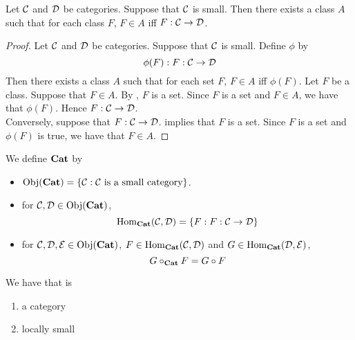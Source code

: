 \documentclass{book}
\begin{document}
	\begin{ex} 
		Let $\mathcal{C}$ and $\mathcal{D}$ be categories. Suppose that $\mathcal{C}$ is small. Then there exists a class $A$ such that for each class $F$, $F \in A$ iff $F: \mathcal{C} \rightarrow \mathcal{D}$.   
	\end{ex}
	
	\begin{proof} 
		Let $\mathcal{C}$ and $\mathcal{D}$ be categories. Suppose that $\mathcal{C}$ is small. Define $\phi$ by 
		$$\phi(F) : F : \mathcal{C} \rightarrow \mathcal{D}$$ 
		Then there exists a class $A$ such that for each set $F$, $F \in A$ iff $\phi(F)$. Let $F$ be a class. Suppose that $F \in A$. By , $F$ is a set. Since $F$ is a set and $F \in A$, we have that $\phi(F)$. Hence $F: \mathcal{C} \rightarrow \mathcal{D}$. \\
		Conversely, suppose that $F: \mathcal{C} \rightarrow \mathcal{D}$.  implies that $F$ is a set. Since $F$ is a set and $\phi(F)$ is true, we have that $F \in A$. 
	\end{proof}
	
	\begin{defn} 
		We define $\textbf{Cat}$ by 
		\begin{itemize}
			\item $\operatorname{Obj}(\textbf{Cat}) = \{\mathcal{C}: \mathcal{C} \text{ is a small category}\}$.
			\item for $\mathcal{C},\mathcal{D} \in \operatorname{Obj}(\textbf{Cat})$, 
			$$\operatorname{Hom}_{\textbf{Cat}}(\mathcal{C},\mathcal{D}) = \{F : F: \mathcal{C} \rightarrow \mathcal{D} \}$$
			\item for $\mathcal{C},\mathcal{D}, \mathcal{E} \in \operatorname{Obj}(\textbf{Cat})$, $F \in \operatorname{Hom}_{\textbf{Cat}}(\mathcal{C},\mathcal{D})$ and $G \in \operatorname{Hom}_{\textbf{Cat}}(\mathcal{D}, \mathcal{E})$, $$G \circ_{\textbf{Cat}} F = G \circ F$$
		\end{itemize}
	\end{defn}


	\begin{ex}  
		We have that  is 
		\begin{enumerate}
			\item a category
			\item locally small
		\end{enumerate} 
	\end{ex}
\end{document}
